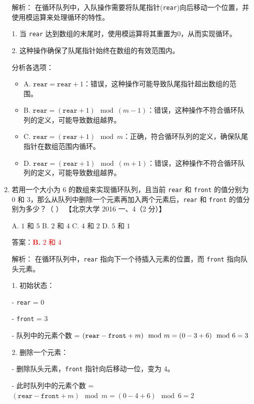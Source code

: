 \documentclass[lang=cn,newtx,10pt,scheme=chinese]{../../../elegantbook}
\begin{document}
\begin{enumerate}
    解析：
    在循环队列中，入队操作需要将队尾指针(\texttt{rear})向后移动一个位置，并使用模运算来处理循环的特性。

    1. 当 \texttt{rear} 达到数组的末尾时，使用模运算将其重置为0，从而实现循环。

    2. 这种操作确保了队尾指针始终在数组的有效范围内。

    分析各选项：
    \begin{itemize}
        \item A. $\texttt{rear} = \texttt{rear} + 1$：错误，这种操作可能导致队尾指针超出数组的范围。
        
        \item B. $\texttt{rear} = (\texttt{rear} + 1) \mod (m - 1)$：错误，这种操作不符合循环队列的定义，可能导致数组越界。
        
        \item C. $\texttt{rear} = (\texttt{rear} + 1) \mod m$：正确，符合循环队列的定义，确保队尾指针在数组范围内循环。
        
        \item D. $\texttt{rear} = (\texttt{rear} + 1) \mod (m + 1)$：错误，这种操作不符合循环队列的定义，可能导致数组越界。
    \end{itemize}

    \item 若用一个大小为 6 的数组来实现循环队列，且当前 \texttt{rear} 和 \texttt{front} 的值分别为 $0$ 和 $3$，那么从队列中删除一个元素再加入两个元素后，\texttt{rear} 和 \texttt{front} 的值分别为多少？（ ）  
    【北京大学 2016 一、4（2 分）】  

    A. $1$ 和 $5$ \quad B. $2$ 和 $4$ \quad C. $4$ 和 $2$ \quad D. $5$ 和 $1$  

    答案：\textcolor{red}{\textbf{B.} $2$ 和 $4$}

    解析：
    在循环队列中，\texttt{rear} 指向下一个待插入元素的位置，而 \texttt{front} 指向队头元素。

    1. 初始状态：

       - \texttt{rear} = 0

       - \texttt{front} = 3

       - 队列中的元素个数 = $(\text{\texttt{rear}} - \text{\texttt{front}} + m) \mod m = (0 - 3 + 6) \mod 6 = 3$

    2. 删除一个元素：

       - 删除队头元素，\texttt{front} 指针向后移动一位，变为 4。

       - 此时队列中的元素个数 = $(\texttt{rear} - \texttt{front} + m) \mod m = (0 - 4 + 6) \mod 6 = 2$


\end{enumerate}
\end{document}
